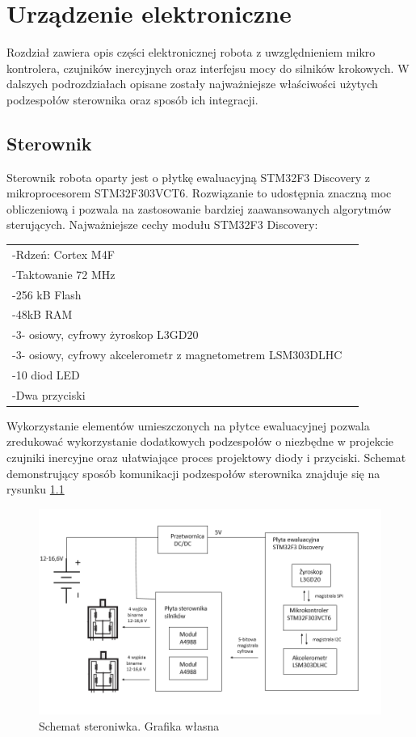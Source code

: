 \chapter{Urządzenie elektroniczne}

Rozdział zawiera opis części elektronicznej robota z uwzględnieniem mikro kontrolera, czujników inercyjnych oraz interfejsu mocy do silników krokowych. W dalszych podrozdziałach opisane zostały najważniejsze właściwości użytych podzespołów sterownika oraz sposób ich integracji. 

\section{Sterownik}

Sterownik robota oparty jest o płytkę ewaluacyjną STM32F3 Discovery z mikroprocesorem STM32F303VCT6. Rozwiązanie to udostępnia znaczną moc obliczeniową i pozwala na zastosowanie bardziej zaawansowanych algorytmów sterujących. Najważniejsze cechy modułu STM32F3 Discovery: 

	\begin{tabular}{  l   p{3cm} |}
	-Rdzeń: Cortex M4F \\
	-Taktowanie 72 MHz  \\
	-256 kB Flash \\
	-48kB RAM \\
	-3- osiowy, cyfrowy żyroskop L3GD20 \\
	-3- osiowy, cyfrowy akcelerometr z magnetometrem LSM303DLHC \\
	-10 diod LED  \\
	-Dwa przyciski 		 \\	
\end{tabular}  




Wykorzystanie elementów umieszczonych na płytce ewaluacyjnej pozwala zredukować wykorzystanie dodatkowych podzespołów o niezbędne w projekcie czujniki inercyjne oraz ułatwiające proces projektowy diody i przyciski. Schemat demonstrujący sposób komunikacji podzespołów sterownika znajduje się na rysunku \ref{schemat}



\begin{figure}[h]
	\centering
	\includegraphics[scale=0.6]{schemat_sterownika.png}
	\caption{ Schemat steroniwka. Grafika własna}
	\label{schemat}
\end{figure}


